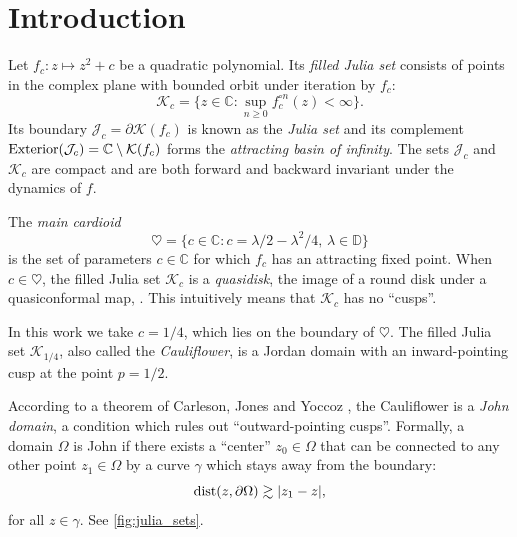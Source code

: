 

\usepackage{subcaption}



\section{Introduction}

% 

Let $f_c: z\mapsto z^2 + c$ be a quadratic polynomial. Its {\em filled Julia set} consists of points in the complex plane with bounded orbit
under iteration by $f_c$:
$$
\mathcal K_c = \{z \in \mathbb{C} : \sup_{n \ge 0} f_c^{\circ n}(z) < \infty \}.
$$
Its boundary $\mathcal J_c = \partial \mathcal K(f_c)$ is known as the {\em Julia set} and its complement $\operatorname{Exterior}(\mathcal{J}_c) = \mathbb{C} \setminus \mathcal K(f_c)$ forms the {\em attracting basin of infinity}. The sets $\mathcal J_c$ and $\mathcal K_c$ are compact and are both forward and backward invariant under the dynamics of $f$.
 
The {\em main cardioid}
$$
\heartsuit = \bigl  \{c \in \mathbb{C}: c = \lambda/2 - \lambda^2/4,\, \lambda \in \mathbb{D} \bigr \}
$$
is the set of parameters $c \in \mathbb{C}$ for which $f_c$ has an attracting fixed point.
When $c \in \heartsuit$, the filled Julia set $\mathcal K_c$ is a \emph{quasidisk}\/, the image of a round disk under a quasiconformal map, \cite[Theorem VI.2.1]{gamelin2003complex}.
This intuitively means that $\mathcal K_c$ has no \enquote{cusps}.


In this work we take $c=1/4$, which lies on the boundary of $\heartsuit$. 
The filled Julia set $\mathcal K_{1/4}$, also called the \emph{Cauliflower}, 
is a Jordan domain with an inward-pointing cusp at the point $p=1/2$.

According to a theorem of Carleson, Jones and Yoccoz \cite[Theorem 6.1]{carleson_julia_1994}, 
the Cauliflower is a \emph{John domain}\/, a condition which rules out \enquote{outward-pointing cusps}. 
Formally, a domain $\Omega$ is John if there exists a \enquote{center} 
$z_0 \in \Omega$ that can be connected 
to any other point $z_1\in \Omega$ by a curve $\gamma$ which stays away from the boundary:
\begin{equation}
	\operatorname{dist}(z, \partial \Omega) \gtrsim |z_1-z|,
\end{equation} for all $z\in \gamma$.
 See \cref{fig:julia_sets}.

